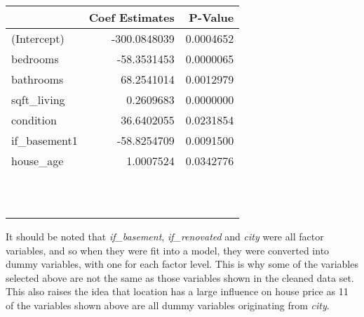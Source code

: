 \documentclass[
]{article}
\begin{document}
\begin{tabular}{|>{}l|r|>{}r|}
\hline
  & Coef Estimates & P-Value\\
\hline
(Intercept) & -300.0848039 & 0.0004652\\
\hline
bedrooms & -58.3531453 & 0.0000065\\
\hline
bathrooms & 68.2541014 & 0.0012979\\
\hline
sqft\_living & 0.2609683 & 0.0000000\\
\hline
condition & 36.6402055 & 0.0231854\\
\hline
if\_basement1 & -58.8254709 & 0.0091500\\
\hline
house\_age & 1.0007524 & 0.0342776\\
\hline
\cellcolor{grey}{cityBellevue} & \cellcolor{grey}{402.9644709} & \cellcolor{grey}{0.0000000}\\
\hline
\cellcolor{grey}{cityIssaquah} & \cellcolor{grey}{192.8171552} & \cellcolor{grey}{0.0023546}\\
\hline
\cellcolor{grey}{cityKent} & \cellcolor{grey}{192.0829810} & \cellcolor{grey}{0.0023943}\\
\hline
\cellcolor{grey}{cityKirkland} & \cellcolor{grey}{286.7290160} & \cellcolor{grey}{0.0000059}\\
\hline
\cellcolor{grey}{cityMedina} & \cellcolor{grey}{1191.9241550} & \cellcolor{grey}{0.0000000}\\
\hline
\cellcolor{grey}{cityMercerisland} & \cellcolor{grey}{529.6076728} & \cellcolor{grey}{0.0000000}\\
\hline
\cellcolor{grey}{cityRedmond} & \cellcolor{grey}{243.3809709} & \cellcolor{grey}{0.0000647}\\
\hline
\cellcolor{grey}{citySammamish} & \cellcolor{grey}{217.8271899} & \cellcolor{grey}{0.0008843}\\
\hline
\cellcolor{grey}{citySeattle} & \cellcolor{grey}{313.5117092} & \cellcolor{grey}{0.0000000}\\
\hline
\cellcolor{grey}{cityShoreline} & \cellcolor{grey}{158.5865198} & \cellcolor{grey}{0.0215383}\\
\hline
\cellcolor{grey}{cityWoodinville} & \cellcolor{grey}{143.9101433} & \cellcolor{grey}{0.0460584}\\
\hline
\end{tabular}

It should be noted that \emph{if\_basement}, \emph{if\_renovated} and
\emph{city} were all factor variables, and so when they were fit into a
model, they were converted into dummy variables, with one for each
factor level. This is why some of the variables selected above are not
the same as those variables shown in the cleaned data set. This also
raises the idea that location has a large influence on house price as 11
of the variables shown above are all dummy variables originating from
\emph{city}.
\end{document}
